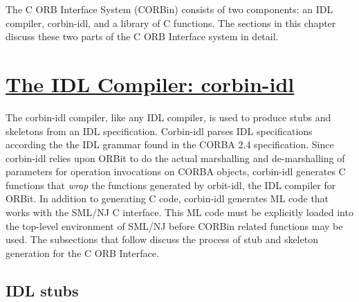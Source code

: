 
The C ORB Interface System (CORBin) consists of two components: an IDL compiler, 
corbin-idl,  and a library of C functions.   The sections in this chapter 
discuss these two parts of the C ORB Interface system in detail. 

\section*{\underline{The IDL Compiler:  corbin-idl}}

The corbin-idl compiler, like any IDL compiler, is used to produce stubs and 
skeletons from an IDL specification.   Corbin-idl parses IDL specifications
according the the IDL grammar found in the CORBA 2$.$4 specification.
Since corbin-idl relies upon ORBit to do the actual marshalling and 
de-marshalling of parameters for operation invocations on CORBA objects, 
corbin-idl generates C functions that {\em{wrap}} the functions generated 
by orbit-idl, the IDL compiler for ORBit.   In addition to generating 
C code, corbin-idl generates ML code that works with the SML/NJ C 
interface. \cite{lorenz} This ML code must be explicitly loaded into 
the top-level environment of SML/NJ before CORBin related functions 
may be used. The subsections that follow discuss the process of 
stub and skeleton generation for the C ORB Interface. 

\subsection*{IDL stubs}

